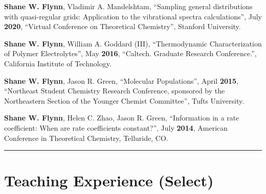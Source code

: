 \documentclass[letterpaper]{article}
\renewenvironment{itemize}{
  \begin{list}{}{
    \setlength{\leftmargin}{1.5em}
  }
}{
  \end{list}
}
\begin{document}
\begin{itemize}

\item \textbf{Shane W. Flynn}, Vladimir A. Mandelshtam, ``Sampling general distributions
      with quasi-regular grids: Application to the vibrational spectra
      calculations'', July \textbf{2020}, ``Virtual Conference on Theoretical
      Chemistry'', Stanford University.

\item \textbf{Shane W. Flynn}, William A. Goddard (III), ``Thermodynamic
      Characterization of Polymer Electrolytes'', May \textbf{2016}, ``Caltech.
      Graduate Research Conference.'', California Institute of Technology.

\item \textbf{Shane W. Flynn}, Jason R. Green, ``Molecular Populations'', April
      \textbf{2015}, ``Northeast Student Chemistry Research Conference,
      sponsored by the Northeastern Section of the Younger Chemist Committee'',
      Tufts University.

\item \textbf{Shane W. Flynn}, Helen C. Zhao, Jason R. Green, ``Information in
      a rate coefficient: When are rate coefficients constant?'', July
      \textbf{2014}, American Conference in Theoretical Chemistry, Telluride, CO.

\end{itemize}

\vspace{0.1in}
\hrule

\section*{Teaching Experience (Select)}
\end{document}
